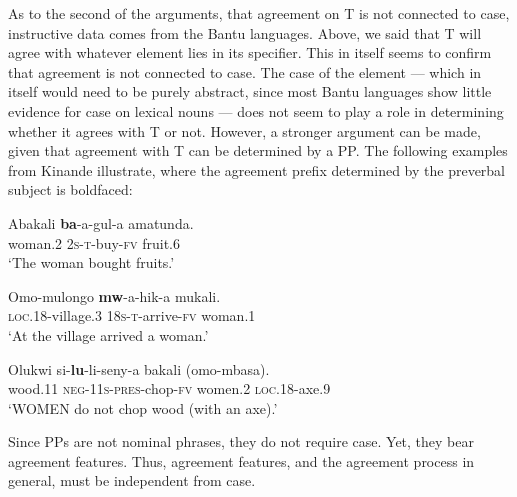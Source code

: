\documentclass[output=paper
,modfonts
,nonflat]{langsci/langscibook}
\begin{document}
As to the second of the arguments, that agreement on T is not connected to case, instructive data comes from the Bantu languages.
Above, we said that T will agree with whatever element lies in its specifier.
This in itself seems to confirm that agreement is not connected to case. The case of the element --- which in itself would need to be purely abstract, since most Bantu languages show little evidence for case on lexical nouns --- does not seem to play a role in determining whether it agrees with T or not.
However, a stronger argument can be made, given that agreement with T can be determined by a PP.
The following examples from Kinande illustrate, where the agreement prefix determined by the preverbal subject is boldfaced:
\begin{exe}
	\ex 
	\begin{xlist}
		\ex
		\gll Abakali \textbf{ba}-a-gul-a amatunda.\\
		woman.\textsc{2} \textsc{2s-t}-buy-\textsc{fv} fruit.\textsc{6}\\
		\glt `The woman bought fruits.'
		
		\ex 
		\gll Omo-mulongo \textbf{mw}-a-hik-a mukali.\\
		\textsc{loc.18}-village.\textsc{3} \textsc{18s-t}-arrive-\textsc{fv} woman.\textsc{1}\\
		\glt `At the village arrived a woman.'
		
		\ex 
		\gll Olukwi si-\textbf{lu}-li-seny-a bakali (omo-mbasa).\\
		wood.\textsc{11} \textsc{neg-11s-pres}-chop-\textsc{fv} women.\textsc{2} \textsc{loc.18}-axe.\textsc{9}\\
		\glt `WOMEN do not chop wood (with an axe).'
		
	\end{xlist}
\end{exe}
Since PPs are not nominal phrases, they do not require case.
Yet, they bear agreement features. Thus, agreement features, and the agreement process in general, must be independent from case.
\end{document}
